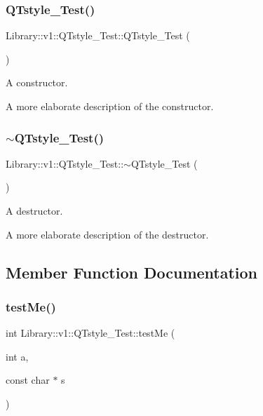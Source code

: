\subsubsection{\texorpdfstring{Q\+Tstyle\+\_\+\+Test()}{QTstyle\_Test()}}
{\footnotesize\ttfamily Library\+::v1\+::\+Q\+Tstyle\+\_\+\+Test\+::\+Q\+Tstyle\+\_\+\+Test (\begin{DoxyParamCaption}{ }\end{DoxyParamCaption})}



A constructor. 

A more elaborate description of the constructor. \mbox{\label{class_library_1_1v1_1_1_q_tstyle___test_a418dfdd3063f4cc861dda19ff1e5864b}} 
\subsubsection{\texorpdfstring{$\sim$\+Q\+Tstyle\+\_\+\+Test()}{~QTstyle\_Test()}}
{\footnotesize\ttfamily Library\+::v1\+::\+Q\+Tstyle\+\_\+\+Test\+::$\sim$\+Q\+Tstyle\+\_\+\+Test (\begin{DoxyParamCaption}{ }\end{DoxyParamCaption})}



A destructor. 

A more elaborate description of the destructor. 

\subsection{Member Function Documentation}
\mbox{\label{class_library_1_1v1_1_1_q_tstyle___test_a0b4844a356f8d483b80e470d6762248b}} 
\subsubsection{\texorpdfstring{test\+Me()}{testMe()}}
{\footnotesize\ttfamily int Library\+::v1\+::\+Q\+Tstyle\+\_\+\+Test\+::test\+Me (\begin{DoxyParamCaption}\item[{int}]{a,  }\item[{const char $\ast$}]{s }\end{DoxyParamCaption})\hspace{0.3cm}{\ttfamily [inline]}}



